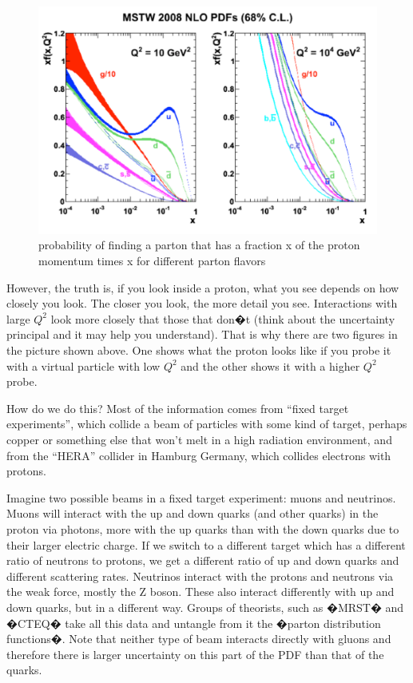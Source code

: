 \begin{figure}[h]
\centering\includegraphics[scale=0.5]{./protonprotoncollisions/Pictures/fig2.pdf}
\caption{probability of finding a parton that has a fraction x of the proton momentum times x for different parton flavors}
\label{fig:pdfpdf}
\end{figure}
However, the truth is, if you look inside a proton, what you see depends on how closely you look. The closer you look, the more detail you see.  Interactions with large \(Q^{2}\) look more closely that those that don�t (think about the uncertainty principal and it may help you understand).  That is why there are two figures in the picture shown above.  One shows what the proton looks like if you probe it with a virtual particle with low \(Q^{2}\) and the other shows it with a higher \(Q^{2}\) probe.

How do we do this?  Most of the information comes from ``fixed target experiments'', which collide a beam of particles with some kind of target, perhaps copper or something else that won't melt in a high radiation environment, and from the ``HERA'' collider in Hamburg Germany, which collides electrons with protons.

Imagine two possible beams in a fixed target experiment: muons and neutrinos.  Muons will interact with the up and down quarks (and other quarks) in the  proton via photons, more with the up quarks than with the down quarks due to their larger electric charge.  If we switch to a different target which has a different ratio of neutrons to protons, we get a different ratio of up and down quarks and different scattering rates.  Neutrinos interact with the protons and neutrons via the weak force, mostly the Z boson.  These also interact differently with up and down quarks, but in a different way.  Groups of theorists, such as �MRST� and �CTEQ� take all this data and untangle from it the �parton distribution functions�.  Note that neither type of beam interacts directly with gluons and therefore there is larger uncertainty on this part of the PDF than that of the quarks.


